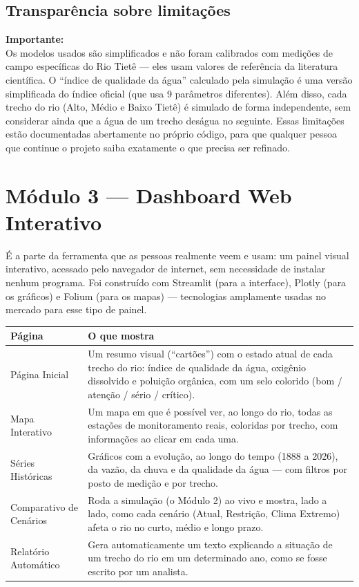 \documentclass[11pt,a4paper]{article}
\begin{document}
\subsection{Transparência sobre limitações}

\begin{calloutbox}
\textbf{Importante:}\\
Os modelos usados são simplificados e não foram calibrados com medições de campo específicas do Rio Tietê — eles usam valores de referência da literatura científica. O ``índice de qualidade da água'' calculado pela simulação é uma versão simplificada do índice oficial (que usa 9 parâmetros diferentes). Além disso, cada trecho do rio (Alto, Médio e Baixo Tietê) é simulado de forma independente, sem considerar ainda que a água de um trecho deságua no seguinte. Essas limitações estão documentadas abertamente no próprio código, para que qualquer pessoa que continue o projeto saiba exatamente o que precisa ser refinado.
\end{calloutbox}

\section{Módulo 3 — Dashboard Web Interativo}

É a parte da ferramenta que as pessoas realmente veem e usam: um painel visual interativo, acessado pelo navegador de internet, sem necessidade de instalar nenhum programa. Foi construído com Streamlit (para a interface), Plotly (para os gráficos) e Folium (para os mapas) — tecnologias amplamente usadas no mercado para esse tipo de painel.

\begin{center}
\begin{longtable}{p{4cm}p{10.5cm}}
\toprule
\textbf{Página} & \textbf{O que mostra} \\
\midrule
\endhead
Página Inicial & Um resumo visual (``cartões'') com o estado atual de cada trecho do rio: índice de qualidade da água, oxigênio dissolvido e poluição orgânica, com um selo colorido (bom / atenção / sério / crítico). \\
Mapa Interativo & Um mapa em que é possível ver, ao longo do rio, todas as estações de monitoramento reais, coloridas por trecho, com informações ao clicar em cada uma. \\
Séries Históricas & Gráficos com a evolução, ao longo do tempo (1888 a 2026), da vazão, da chuva e da qualidade da água — com filtros por posto de medição e por trecho. \\
Comparativo de Cenários & Roda a simulação (o Módulo 2) ao vivo e mostra, lado a lado, como cada cenário (Atual, Restrição, Clima Extremo) afeta o rio no curto, médio e longo prazo. \\
Relatório Automático & Gera automaticamente um texto explicando a situação de um trecho do rio em um determinado ano, como se fosse escrito por um analista. \\
\bottomrule
\end{longtable}
\end{center}
\end{document}
